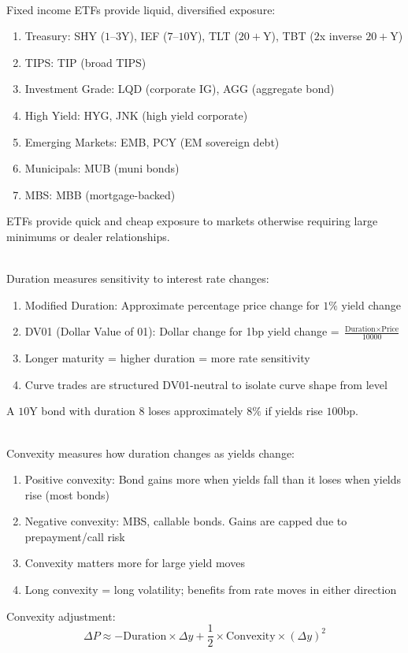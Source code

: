 \begin{remark} \\
Fixed income ETFs provide liquid, diversified exposure:
\begin{enumerate}[label=\roman*.]
\setlength{\itemsep}{0pt}
\item Treasury: SHY ($1$--$3$Y), IEF ($7$--$10$Y), TLT ($20+$Y), TBT ($2$x inverse $20+$Y)
\item TIPS: TIP (broad TIPS)
\item Investment Grade: LQD (corporate IG), AGG (aggregate bond)
\item High Yield: HYG, JNK (high yield corporate)
\item Emerging Markets: EMB, PCY (EM sovereign debt)
\item Municipals: MUB (muni bonds)
\item MBS: MBB (mortgage-backed)
\end{enumerate}
ETFs provide quick and cheap exposure to markets otherwise requiring large minimums or dealer relationships.
\end{remark}

\begin{remark} \\
Duration measures sensitivity to interest rate changes:
\begin{enumerate}[label=\roman*.]
\setlength{\itemsep}{0pt}
\item Modified Duration: Approximate percentage price change for $1\%$ yield change
\item DV01 (Dollar Value of 01): Dollar change for 1bp yield change = $\frac{\text{Duration} \times \text{Price}}{10000}$
\item Longer maturity = higher duration = more rate sensitivity
\item Curve trades are structured DV01-neutral to isolate curve shape from level
\end{enumerate}
A $10$Y bond with duration $8$ loses approximately $8\%$ if yields rise $100$bp.
\end{remark}

\begin{remark} \\
Convexity measures how duration changes as yields change:
\begin{enumerate}[label=\roman*.]
\setlength{\itemsep}{0pt}
\item Positive convexity: Bond gains more when yields fall than it loses when yields rise (most bonds)
\item Negative convexity: MBS, callable bonds. Gains are capped due to prepayment/call risk
\item Convexity matters more for large yield moves
\item Long convexity = long volatility; benefits from rate moves in either direction
\end{enumerate}
Convexity adjustment:
\begin{equation*}
\Delta P \approx -\text{Duration} \times \Delta y + \frac{1}{2} \times \text{Convexity} \times (\Delta y)^2
\end{equation*}
\end{remark}

